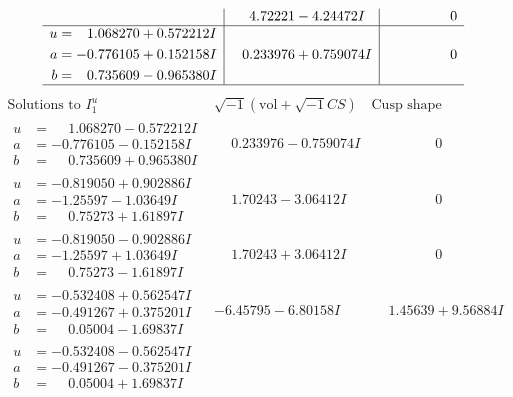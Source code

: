\documentclass[1p]{elsarticle_modified}
\theoremstyle{definition}
\newcommand{\I}{\sqrt{-1}}
\begin{document}
$$\begin{array}{c|c|c}
 & \phantom{-}4.72221 - 4.24472 I & \phantom{-0.000000 } 0 \\ \hline\begin{aligned}
u &= \phantom{-}1.068270 + 0.572212 I \\
a &= -0.776105 + 0.152158 I \\
b &= \phantom{-}0.735609 - 0.965380 I\end{aligned}
 & \phantom{-}0.233976 + 0.759074 I & \phantom{-0.000000 } 0\\
 \hline 
 \end{array}$$\newpage$$\begin{array}{c|c|c}  
\text{Solutions to }I^u_{1}& \I (\text{vol} + \sqrt{-1}CS) & \text{Cusp shape}\\
 \hline 
\begin{aligned}
u &= \phantom{-}1.068270 - 0.572212 I \\
a &= -0.776105 - 0.152158 I \\
b &= \phantom{-}0.735609 + 0.965380 I\end{aligned}
 & \phantom{-}0.233976 - 0.759074 I & \phantom{-0.000000 } 0 \\ \hline\begin{aligned}
u &= -0.819050 + 0.902886 I \\
a &= -1.25597 - 1.03649 I \\
b &= \phantom{-}0.75273 + 1.61897 I\end{aligned}
 & \phantom{-}1.70243 - 3.06412 I & \phantom{-0.000000 } 0 \\ \hline\begin{aligned}
u &= -0.819050 - 0.902886 I \\
a &= -1.25597 + 1.03649 I \\
b &= \phantom{-}0.75273 - 1.61897 I\end{aligned}
 & \phantom{-}1.70243 + 3.06412 I & \phantom{-0.000000 } 0 \\ \hline\begin{aligned}
u &= -0.532408 + 0.562547 I \\
a &= -0.491267 + 0.375201 I \\
b &= \phantom{-}0.05004 - 1.69837 I\end{aligned}
 & -6.45795 - 6.80158 I & \phantom{-}1.45639 + 9.56884 I \\ \hline\begin{aligned}
u &= -0.532408 - 0.562547 I \\
a &= -0.491267 - 0.375201 I \\
b &= \phantom{-}0.05004 + 1.69837 I\end{aligned}

\end{array}$$
\end{document}
